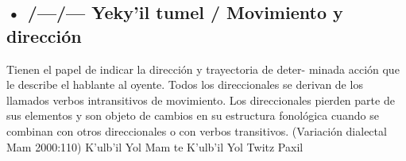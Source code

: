 \documentclass{article}%
\begin{document}
\subsection{• /—/— Yeky'il tumel / Movimiento y dirección}%
\label{subsec://Yekyiltumel/Movimientoydireccin}%

%
Tienen el papel de indicar la dirección y trayectoria de deter{-} %
minada acción que le describe el hablante al oyente. Todos los %
direccionales se derivan de los llamados verbos intransitivos de %
movimiento. Los direccionales pierden parte de sus elementos %
y son objeto de cambios en su estructura fonológica cuando %
se combinan con otros direccionales o con verbos transitivos. %
(Variación dialectal Mam 2000:110) %
K'ulb'il Yol Mam te K'ulb'il Yol Twitz Paxil 

%
\end{document}
